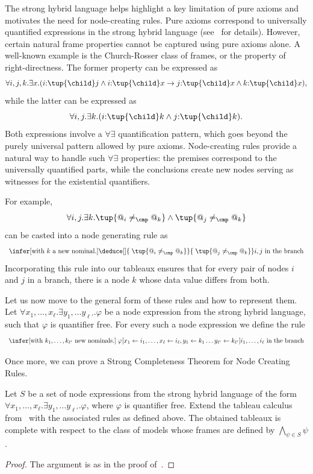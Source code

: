 The strong hybrid language helps highlight a key limitation of pure axioms and motivates the need for node-creating rules. Pure axioms correspond to universally quantified expressions in the strong hybrid language (see~\cite[Prop.~3.2]{Blackburn2002BeyondPA} for details). However, certain natural frame properties cannot be captured using pure axioms alone.
A well-known example is the Church-Rosser class of frames, or the property of right-directness. The former property can be expressed as 
\[
    \forall i,j,k.\exists x. (i{:}\tup{\child} j \land  i{:}\tup{\child}x \to j{:}\tup{\child}x \land k{:}\tup{\child}x),
\]
while the latter can be expressed as
\[
    \forall i,j.\exists k. (i{:}\tup{\child} k \land j{:}\tup{\child} k).
\]
Both expressions involve a $\forall\exists$ quantification pattern, which goes beyond the purely universal pattern allowed by pure axioms. Node-creating rules provide a natural way to handle such $\forall\exists$ properties: the premises correspond to the universally quantified parts, while the conclusions create new nodes serving as witnesses for the existential quantifiers.

For example,
\[
\forall i,j.\exists k. \tup{@_i\neq_\cmp @_k}\land\tup{@_j\neq_\cmp @_k}
\]
can be casted into a node generating rule as
\[
\begin{array}{c}
{\infer[\text{with $k$ a new nominal.}]
{
\deduce[]
{\phantom{|} {\tup{@_i\neq_\cmp @_k}}}    
{\phantom{|}{\tup{@_j\neq_\cmp @_k}}}}
{\text{$i,j$ in the branch}
}
}
\end{array}
\]
Incorporating this rule into our tableaux ensures that for every pair of nodes $i$ and $j$ in a branch, there is a node $k$ whose data value differs from both.

Let us now move to the general form of these rules and how to represent them. Let $\forall x_1,\ldots,x_\ell.\exists y_1,\ldots y_{\ell'}.\varphi$ be a node expression from the strong hybrid language, such that $\varphi$ is quantifier free. For every such a node expression we define the rule  
\[
\begin{array}{c}
{\infer[\text{with $k_1,\ldots,k_{\ell'}$ new nominals.}]
{
\phantom{|} {\varphi[x_1 \leftarrow i_1,\ldots,x_\ell \leftarrow i_\ell, y_1\leftarrow k_1\ldots y_{\ell'}\leftarrow k_{\ell'}]}}
{\text{$i_1,\ldots,i_{\ell}$ in the branch}}
}
\end{array}
\]

Once more, we can prove a Strong Completeness Theorem for Node Creating Rules.

\begin{thm}
    Let $S$ be a set of node expressions from the strong hybrid language of the form $\forall x_1,\ldots,x_\ell.\exists y_1,\ldots y_{\ell'}.\varphi$, where $\varphi$ is quantifier free.
    Extend the tableau calculus from~ with the associated rules as defined above. The obtained tableaux is complete with respect to the class of models whose frames are defined by $\bigwedge_{\psi\in S} \psi$.
\end{thm}

\begin{proof}
The argument is as in the proof of~.
\end{proof}